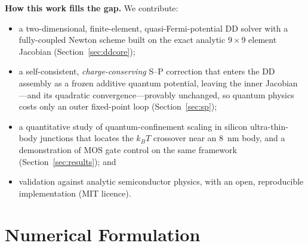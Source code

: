 \documentclass[conference]{IEEEtran}
\begin{document}
\noindent\textbf{How this work fills the gap.} We contribute:
\begin{itemize}
\item a two-dimensional, finite-element, quasi-Fermi-potential DD solver with a
fully-coupled Newton scheme built on the exact analytic $9\times9$ element
Jacobian (Section~\ref{sec:ddcore});
\item a self-consistent, \emph{charge-conserving} S--P correction that enters the
DD assembly as a frozen additive quantum potential, leaving the inner Jacobian---and
its quadratic convergence---provably unchanged, so quantum physics costs only an
outer fixed-point loop (Section~\ref{sec:sp});
\item a quantitative study of quantum-confinement scaling in silicon
ultra-thin-body junctions that locates the $k_BT$ crossover near an $8$~nm body,
and a demonstration of MOS gate control on the same framework
(Section~\ref{sec:results}); and
\item validation against analytic semiconductor physics, with an open,
reproducible implementation (MIT licence).
\end{itemize}

\section{Numerical Formulation}
\label{sec:method}
\end{document}
